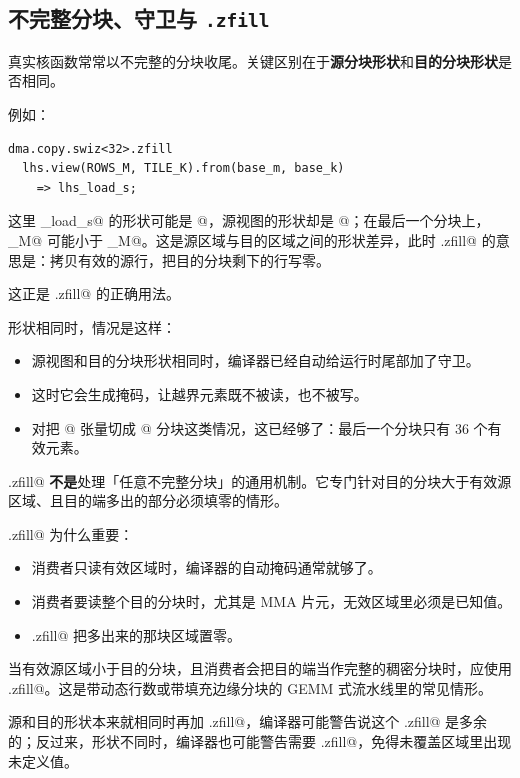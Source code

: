 \subsection*{不完整分块、守卫与 \texttt{.zfill}}

真实核函数常常以不完整的分块收尾。关键区别在于\textbf{源分块形状}和\textbf{目的分块形状}是否相同。

例如：

\begin{lstlisting}[language=croqtile,caption={不完整分块、守卫与 .zfill}]
dma.copy.swiz<32>.zfill
  lhs.view(ROWS_M, TILE_K).from(base_m, base_k)
    => lhs_load_s;
\end{lstlisting}

这里 \co@lhs_load_s@ 的形状可能是 @，源视图的形状却是 @；在最后一个分块上，\co@ROWS_M@ 可能小于 \co@group_M@。这是源区域与目的区域之间的形状差异，此时 \co@.zfill@ 的意思是：拷贝有效的源行，把目的分块剩下的行写零。

这正是 \co@.zfill@ 的正确用法。

形状相同时，情况是这样：

\begin{itemize}[leftmargin=1.6em]
\item 源视图和目的分块形状相同时，编译器已经自动给运行时尾部加了守卫。
\item 这时它会生成掩码，让越界元素既不被读，也不被写。
\item 对把 \co@[100]@ 张量切成 \co@[64]@ 分块这类情况，这已经够了：最后一个分块只有 36 个有效元素。
\end{itemize}

\co@.zfill@ \textbf{不是}处理「任意不完整分块」的通用机制。它专门针对目的分块大于有效源区域、且目的端多出的部分必须填零的情形。

\co@.zfill@ 为什么重要：

\begin{itemize}[leftmargin=1.6em]
\item 消费者只读有效区域时，编译器的自动掩码通常就够了。
\item 消费者要读整个目的分块时，尤其是 MMA 片元，无效区域里必须是已知值。
\item \co@.zfill@ 把多出来的那块区域置零。
\end{itemize}

当有效源区域小于目的分块，且消费者会把目的端当作完整的稠密分块时，应使用 \co@.zfill@。这是带动态行数或带填充边缘分块的 GEMM 式流水线里的常见情形。

源和目的形状本来就相同时再加 \co@.zfill@，编译器可能警告说这个 \co@.zfill@ 是多余的；反过来，形状不同时，编译器也可能警告需要 \co@.zfill@，免得未覆盖区域里出现未定义值。
